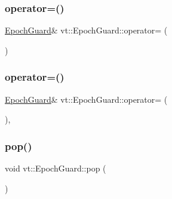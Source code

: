 \subsubsection{\texorpdfstring{operator=()}{operator=()}\hspace{0.1cm}{\footnotesize\ttfamily [1/2]}}
{\footnotesize\ttfamily \hyperlink{structvt_1_1_epoch_guard}{Epoch\+Guard}\& vt\+::\+Epoch\+Guard\+::operator= (\begin{DoxyParamCaption}\item[{const \hyperlink{structvt_1_1_epoch_guard}{Epoch\+Guard} \&}]{ }\end{DoxyParamCaption})\hspace{0.3cm}{\ttfamily [delete]}}

\mbox{\label{structvt_1_1_epoch_guard_aac8048b562920e1628ee5020d0e29da4}} 
\subsubsection{\texorpdfstring{operator=()}{operator=()}\hspace{0.1cm}{\footnotesize\ttfamily [2/2]}}
{\footnotesize\ttfamily \hyperlink{structvt_1_1_epoch_guard}{Epoch\+Guard}\& vt\+::\+Epoch\+Guard\+::operator= (\begin{DoxyParamCaption}\item[{\hyperlink{structvt_1_1_epoch_guard}{Epoch\+Guard} \&\&}]{ }\end{DoxyParamCaption})\hspace{0.3cm}{\ttfamily [default]}, {\ttfamily [noexcept]}}

\mbox{\label{structvt_1_1_epoch_guard_aa0106927b2e50b4be20bee542d264dba}} 
\subsubsection{\texorpdfstring{pop()}{pop()}}
{\footnotesize\ttfamily void vt\+::\+Epoch\+Guard\+::pop (\begin{DoxyParamCaption}{ }\end{DoxyParamCaption})}



